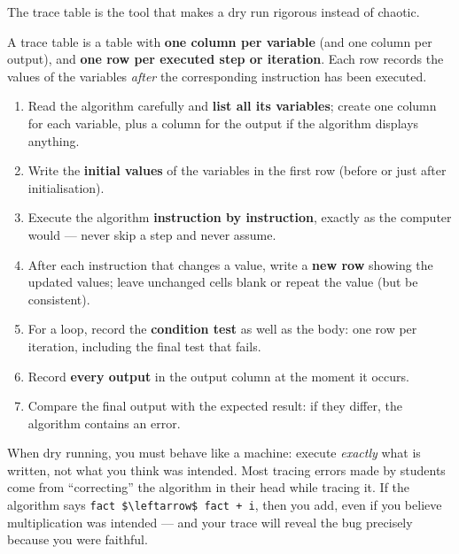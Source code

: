 \documentclass[11pt]{article}
\newcommand{\cle}[1]{{\popxbold\color{popdark}#1}}
\newcounter{popsec}
\newcounter{popsub}
\newcommand{\courssub}[1]{%
  \stepcounter{popsub}%
  \par\vspace{9pt}\noindent{\popxbold\fontsize{11.5}{13}\selectfont\color{popink}{\color{poporange}\thepopsec.\thepopsub}\hspace{6pt}#1}\par\nopagebreak\vspace{4pt}
}
\begin{document}
\courssub{The trace table}

The trace table is the tool that makes a dry run rigorous instead of chaotic.

\begin{definition}
A \cle{trace table} is a table with \textbf{one column per variable} (and one column per output), and \textbf{one row per executed step or iteration}. Each row records the values of the variables \emph{after} the corresponding instruction has been executed.
\end{definition}

\begin{methode}
\begin{enumerate}
\item Read the algorithm carefully and \textbf{list all its variables}; create one column for each variable, plus a column for the output if the algorithm displays anything.
\item Write the \textbf{initial values} of the variables in the first row (before or just after initialisation).
\item Execute the algorithm \textbf{instruction by instruction}, exactly as the computer would --- never skip a step and never assume.
\item After each instruction that changes a value, write a \textbf{new row} showing the updated values; leave unchanged cells blank or repeat the value (but be consistent).
\item For a loop, record the \textbf{condition test} as well as the body: one row per iteration, including the final test that fails.
\item Record \textbf{every output} in the output column at the moment it occurs.
\item Compare the final output with the expected result: if they differ, the algorithm contains an error.
\end{enumerate}
\end{methode}

\begin{attention}
When dry running, you must behave like a machine: execute \emph{exactly} what is written, not what you think was intended. Most tracing errors made by students come from ``correcting'' the algorithm in their head while tracing it. If the algorithm says \texttt{fact \$\textbackslash{}leftarrow\$ fact + i}, then you add, even if you believe multiplication was intended --- and your trace will reveal the bug precisely because you were faithful.
\end{attention}
\end{document}
